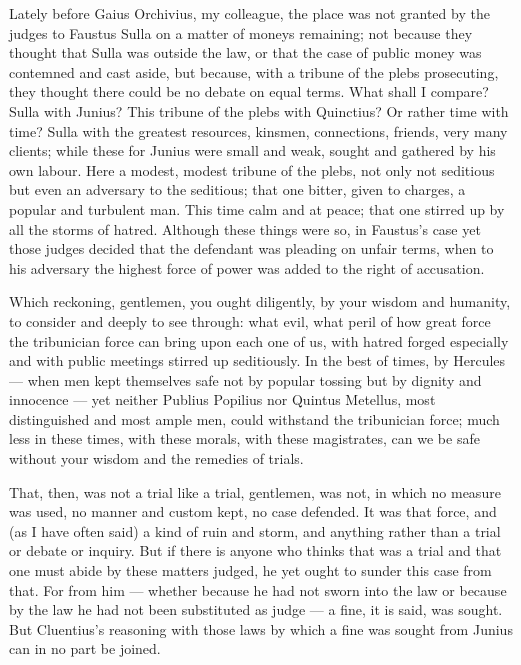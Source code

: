  Lately before Gaius Orchivius, my colleague, the place was not granted by the judges to Faustus Sulla on a matter of moneys remaining; not because they thought that Sulla was outside the law, or that the case of public money was contemned and cast aside, but because, with a tribune of the plebs prosecuting, they thought there could be no debate on equal terms. What shall I compare? Sulla with Junius? This tribune of the plebs with Quinctius? Or rather time with time? Sulla with the greatest resources, kinsmen, connections, friends, very many clients; while these for Junius were small and weak, sought and gathered by his own labour. Here a modest, modest tribune of the plebs, not only not seditious but even an adversary to the seditious; that one bitter, given to charges, a popular and turbulent man. This time calm and at peace; that one stirred up by all the storms of hatred. Although these things were so, in Faustus's case yet those judges decided that the defendant was pleading on unfair terms, when to his adversary the highest force of power was added to the right of accusation.

 Which reckoning, gentlemen, you ought diligently, by your wisdom and humanity, to consider and deeply to see through: what evil, what peril of how great force the tribunician force can bring upon each one of us, with hatred forged especially and with public meetings stirred up seditiously. In the best of times, by Hercules --- when men kept themselves safe not by popular tossing but by dignity and innocence --- yet neither Publius Popilius nor Quintus Metellus, most distinguished and most ample men, could withstand the tribunician force; much less in these times, with these morals, with these magistrates, can we be safe without your wisdom and the remedies of trials.

 That, then, was not a trial like a trial, gentlemen, was not, in which no measure was used, no manner and custom kept, no case defended. It was that force, and (as I have often said) a kind of ruin and storm, and anything rather than a trial or debate or inquiry. But if there is anyone who thinks that was a trial and that one must abide by these matters judged, he yet ought to sunder this case from that. For from him --- whether because he had not sworn into the law or because by the law he had not been substituted as judge --- a fine, it is said, was sought. But Cluentius's reasoning with those laws by which a fine was sought from Junius can in no part be joined.

